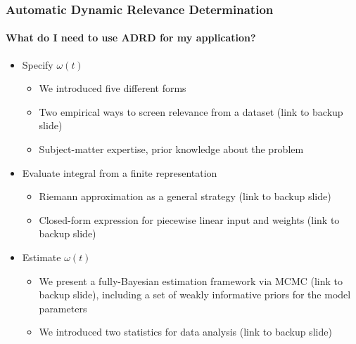 \documentclass{snedecorbeamer}
\begin{document}
\begin{frame}
  \frametitle{Automatic Dynamic Relevance Determination}
  \framesubtitle{What do I need to use \textsc{ADRD} for my application?}

  \begin{itemize}
  \item Specify $\omega(t)$
    \begin{itemize}
    \item We introduced five different forms
    \item Two empirical ways to screen relevance from a dataset
      (link to backup slide)
    \item Subject-matter expertise, prior knowledge about the problem
    \end{itemize}
  \item Evaluate integral from a finite representation
    \begin{itemize}
    \item Riemann approximation as a general strategy (link to backup slide)
    \item Closed-form expression for piecewise linear input and weights (link to
      backup slide)
    \end{itemize}
  \item Estimate $\omega(t)$
    \begin{itemize}
    \item We present a fully-Bayesian estimation framework via MCMC
      (link to backup slide), including a set of weakly informative priors for
      the model parameters
      \item We introduced two statistics for data analysis (link to backup
        slide)
    \end{itemize}
  \end{itemize}
\end{frame}
\end{document}
